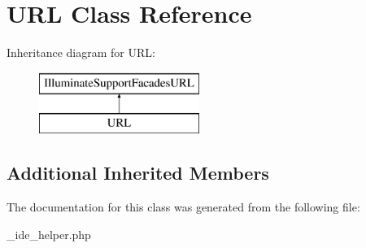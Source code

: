 \hypertarget{class_u_r_l}{}\section{U\+RL Class Reference}
\label{class_u_r_l}
Inheritance diagram for U\+RL\+:\begin{figure}[H]
\begin{center}
\leavevmode
\includegraphics[height=2.000000cm]{class_u_r_l}
\end{center}
\end{figure}
\subsection*{Additional Inherited Members}


The documentation for this class was generated from the following file\+:\begin{DoxyCompactItemize}
\item 
\+\_\+ide\+\_\+helper.\+php\end{DoxyCompactItemize}
